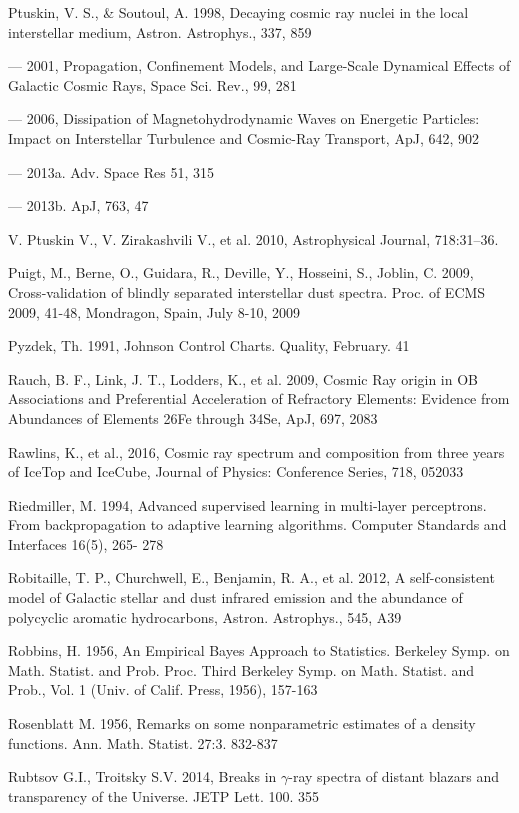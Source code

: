 Ptuskin, V. S., \& Soutoul, A. 1998, Decaying cosmic ray nuclei in the local interstellar medium, Astron. Astrophys., 337, 859

--- 2001, Propagation, Confinement Models, and Large-Scale Dynamical Effects of Galactic Cosmic Rays, Space Sci. Rev., 99, 281

--- 2006, Dissipation of Magnetohydrodynamic Waves on Energetic Particles: Impact on Interstellar Turbulence and Cosmic-Ray Transport, ApJ, 642, 902

--- 2013a. Adv. Space Res 51, 315

--- 2013b. ApJ, 763, 47

V. Ptuskin V., V. Zirakashvili V., et al. 2010, Astrophysical Journal, 718:31--36.

Puigt, M., Berne, O., Guidara, R., Deville, Y., Hosseini, S., Joblin, C. 2009, Cross-validation of blindly separated interstellar dust spectra. Proc. of ECMS 2009, 41-48, Mondragon, Spain, July 8-10, 2009

Pyzdek, Th. 1991, Johnson Control Charts. Quality, February. 41

Rauch, B. F., Link, J. T., Lodders, K., et al. 2009, Cosmic Ray origin in OB Associations and Preferential Acceleration of Refractory Elements: Evidence from Abundances of Elements 26Fe through 34Se, ApJ, 697, 2083

Rawlins, K., et al., 2016, Cosmic ray spectrum and composition from three years of IceTop and IceCube, Journal of Physics: Conference Series, 718, 052033

Riedmiller, M. 1994, Advanced supervised learning in multi-layer perceptrons. From backpropagation to adaptive learning algorithms. Computer Standards and Interfaces 16(5), 265- 278

Robitaille, T. P., Churchwell, E., Benjamin, R. A., et al. 2012, A self-consistent model of Galactic stellar and dust infrared emission and the abundance of polycyclic aromatic hydrocarbons, Astron. Astrophys., 545, A39

Robbins, H. 1956, An Empirical Bayes Approach to Statistics. Berkeley Symp. on Math. Statist. and Prob. Proc. Third Berkeley Symp. on Math. Statist. and Prob., Vol. 1 (Univ. of Calif. Press, 1956), 157-163

Rosenblatt M. 1956, Remarks on some nonparametric estimates of a density functions. Ann. Math. Statist. 27:3. 832-837

Rubtsov G.I., Troitsky S.V. 2014, Breaks in $\gamma$-ray spectra of distant blazars and transparency of the Universe. JETP Lett. 100. 355

